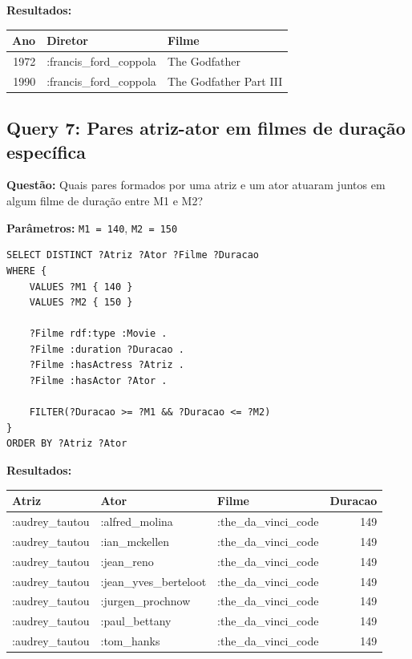 \documentclass[12pt,a4paper]{article}
\begin{document}
\textbf{Resultados:}

\begin{table}[H]
\centering
\begin{tabular}{|r|l|l|}
\hline
\textbf{Ano} & \textbf{Diretor} & \textbf{Filme} \\
\hline
1972 & :francis\_ford\_coppola & The Godfather \\
\hline
1990 & :francis\_ford\_coppola & The Godfather Part III \\
\hline
\end{tabular}
\end{table}
\newpage
\subsection{Query 7: Pares atriz-ator em filmes de duração específica}

\textbf{Questão:} Quais pares formados por uma atriz e um ator atuaram juntos em algum filme de duração entre M1 e M2?

\textbf{Parâmetros:} \texttt{M1 = 140}, \texttt{M2 = 150}

\begin{lstlisting}
SELECT DISTINCT ?Atriz ?Ator ?Filme ?Duracao
WHERE {
    VALUES ?M1 { 140 }
    VALUES ?M2 { 150 }
    
    ?Filme rdf:type :Movie .
    ?Filme :duration ?Duracao .
    ?Filme :hasActress ?Atriz .
    ?Filme :hasActor ?Ator .
    
    FILTER(?Duracao >= ?M1 && ?Duracao <= ?M2)
}
ORDER BY ?Atriz ?Ator
\end{lstlisting}

\textbf{Resultados:}

\begin{table}[H]
\centering
\footnotesize
\begin{tabular}{|l|l|l|r|}
\hline
\textbf{Atriz} & \textbf{Ator} & \textbf{Filme} & \textbf{Duracao} \\
\hline
:audrey\_tautou & :alfred\_molina & :the\_da\_vinci\_code & 149 \\
\hline
:audrey\_tautou & :ian\_mckellen & :the\_da\_vinci\_code & 149 \\
\hline
:audrey\_tautou & :jean\_reno & :the\_da\_vinci\_code & 149 \\
\hline
:audrey\_tautou & :jean\_yves\_berteloot & :the\_da\_vinci\_code & 149 \\
\hline
:audrey\_tautou & :jurgen\_prochnow & :the\_da\_vinci\_code & 149 \\
\hline
:audrey\_tautou & :paul\_bettany & :the\_da\_vinci\_code & 149 \\
\hline
:audrey\_tautou & :tom\_hanks & :the\_da\_vinci\_code & 149 \\
\hline
\end{tabular}
\end{table}
\newpage
\end{document}
